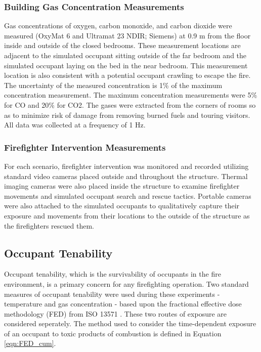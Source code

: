 \documentclass[12pt,oneside]{article}
\begin{document}
\subsubsection{Building Gas Concentration Measurements}
Gas concentrations of oxygen, carbon monoxide, and carbon dioxide were measured (OxyMat 6 and Ultramat 23 NDIR; Siemens) at 0.9 m from the floor inside and outside of the closed bedrooms.   These measurement locations are adjacent to the simulated occupant sitting outside of the far bedroom and the simulated occupant laying on the bed in the near bedroom.  This measurement location is also consistent with a potential occupant crawling to escape the fire.  The uncertainty of the measured concentration is 1\% of the maximum concentration measurement. The maximum concentration measurements were 5\% for CO and 20\% for CO2. The gases were extracted from the corners of rooms so as to minimize risk of damage from removing burned fuels and touring visitors. All data was collected at a frequency of 1 Hz. 

\subsubsection{Firefighter Intervention Measurements}
For each scenario, firefighter intervention was monitored and recorded utilizing standard video cameras placed outside and throughout the structure.  Thermal imaging cameras were also placed inside the structure to examine firefighter movements and simulated occupant search and rescue tactics.  Portable cameras were also attached to the simulated occupants to qualitatively capture their exposure and movements from their locations to the outside of the structure as the firefighters rescued them.

\subsection{Occupant Tenability}
Occupant tenability, which is the survivability of occupants in the fire environment, is a primary concern for any firefighting operation.  Two standard measures of occupant tenability were used during these experiments - temperature and gas concentration - based upon the fractional effective dose methodology (FED) from ISO 13571 \cite{ISO13571}. These two routes of exposure are considered seperately. The method used to consider the time-dependent exposure of an occupant to toxic products of combustion is defined in Equation \ref{eqn:FED_cum}. 
\end{document}
